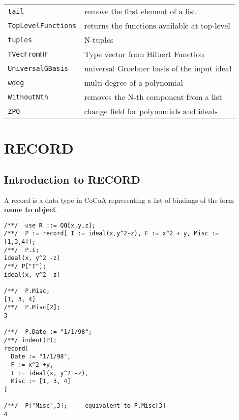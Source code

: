\documentclass[a4paper]{mybook}
\begin{document}
\begin{center}
\begin{longtable}{ll}
{\verb~tail~} &
      remove the first element of a list\\
   
{\verb~TopLevelFunctions~} &
      returns the functions available at top-level\\
   
{\verb~tuples~} &
      N-tuples\\
   
{\verb~TVecFromHF~} &
      Type vector from Hilbert Function\\
   
{\verb~UniversalGBasis~} &
      universal Groebner basis of the input ideal\\
   
{\verb~wdeg~} &
      multi-degree of a polynomial\\
   
{\verb~WithoutNth~} &
      removes the N-th component from a list\\
   
{\verb~ZPQ~} &
      change field for polynomials and ideals\\
   
\end{longtable}
\end{center}

\noindent



\chapter{RECORD}
\label{RECORD}

      

\section{Introduction to RECORD}
\label{Introduction to RECORD}

        
A record is a data type in CoCoA representing a list of bindings of
the form \textbf{name to object}.
\begin{Verbatim}[label=example, rulecolor=\color{PineGreen}, frame=single]
/**/  use R ::= QQ[x,y,z];
/**/  P := record[ I := ideal(x,y^2-z), F := x^2 + y, Misc := [1,3,4]];
/**/  P.I;
ideal(x, y^2 -z)
/**/ P["I"];
ideal(x, y^2 -z)

/**/  P.Misc;
[1, 3, 4]
/**/  P.Misc[2];
3

/**/  P.Date := "1/1/98";
/**/ indent(P);
record[
  Date := "1/1/98",
  F := x^2 +y,
  I := ideal(x, y^2 -z),
  Misc := [1, 3, 4]
]

/**/  P["Misc",3];  -- equivalent to P.Misc[3]
4
\end{Verbatim}
\end{document}
